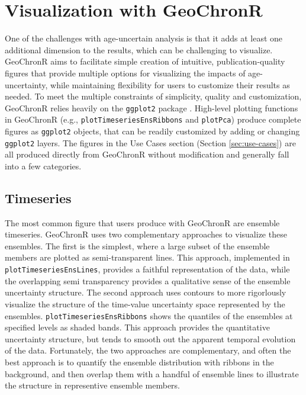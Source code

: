 \documentclass[gchron, manuscript]{copernicus}
\begin{document}
\hypertarget{sec:visualization}{%
\section{Visualization with GeoChronR}\label{sec:visualization}}

One of the challenges with age-uncertain analysis is that it adds at least one additional dimension to the results, which can be challenging to visualize.
GeoChronR aims to facilitate simple creation of intuitive, publication-quality figures that provide multiple options for visualizing the impacts of age-uncertainty, while maintaining flexibility for users to customize their results as needed.
To meet the multiple constraints of simplicity, quality and customization, GeoChronR relies heavily on the \texttt{ggplot2} package \citep{ggplot2}.
High-level plotting functions in GeoChronR (e.g., \texttt{plotTimeseriesEnsRibbons} and \texttt{plotPca}) produce complete figures as \texttt{ggplot2} objects, that can be readily customized by adding or changing \texttt{ggplot2} layers.
The figures in the Use Cases section (Section \ref{sec:use-cases}) are all produced directly from GeoChronR without modification and generally fall into a few categories.

\subsection{Timeseries}

The most common figure that users produce with GeoChronR are ensemble timeseries.
GeoChronR uses two complementary approaches to visualize these ensembles.
The first is the simplest, where a large subset of the ensemble members are plotted as semi-transparent lines.
This approach, implemented in \texttt{plotTimeseriesEnsLines}, provides a faithful representation of the data, while the overlapping semi transparency provides a qualitative sense of the ensemble uncertainty structure.
The second approach uses contours to more rigorlously visualize the structure of the time-value uncertainty space represented by the ensembles.
\texttt{plotTimeseriesEnsRibbons} shows the quantiles of the ensembles at specified levels as shaded bands.
This approach provides the quantitative uncertainty structure, but tends to smooth out the apparent temporal evolution of the data.
Fortunately, the two approaches are complementary, and often the best approach is to quantify the ensemble distribution with ribbons in the background, and then overlap them with a handful of ensemble lines to illustrate the structure in representive ensemble members.
\end{document}
